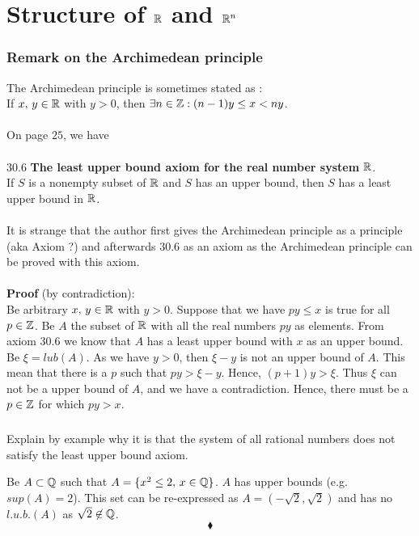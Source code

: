 \chapter{Structure of $\mathbb{R}$ and $\mathbb{R}^{n}$}
\pagebreak[4]

\subsection*{Remark on the Archimedean principle}
The Archimedean principle is sometimes stated as :\\
If $x,\,y\in \mathbb{R}$ with $y>0$, then $\exists n\in \mathbb{Z}: (n-1)y\leq x < ny$.\\\\
On page $25$, we have \\\\
$\mathbf{30.6}$ \textbf{The least upper bound axiom for the real number system} $\mathbf{\mathbb{R}}$.\\
If $S$ is a nonempty subset of $\mathbb{R}$ and $S$ has an upper bound, then $S$ has a least upper bound in $\mathbb{R}$.\\\\
It is strange that  the author first gives the Archimedean principle as a principle (aka Axiom ?) and afterwards $\mathbf{30.6}$ as an axiom as the Archimedean principle can be proved with this axiom. \\\\
\textbf{Proof} (by contradiction):\\
Be arbitrary $x,\, y\in \mathbb{R}$ with $y> 0$. Suppose that we have $py\leq x$ is true for all $p\in \mathbb{Z}$. Be $A$ the subset of $\mathbb{R}$ with all the real numbers $py$ as elements. From axiom $\mathbf{30.6}$ we know that $A$ has a least upper bound with $x$ as an upper bound. Be $\xi= lub(A)$. As we have $y>0$, then $\xi -y$ is not an upper bound of $A$.  This mean that there is a $p$ such that $py>\xi -y$. Hence, $ (p+1)y>\xi$. Thus $\xi$ can not be a upper bound of $A$, and we have a contradiction. Hence, there must be a $p\in \mathbb{Z}$ for which $py>x$.
\newpage
\renewcommand{\thesubsection}{\thesection.\arabic{subsection}}
\setcounter{subsection}{0}
\subsection{}
\begin{tcolorbox}
Explain by example why it is that the system of all rational numbers does not satisfy the least upper bound axiom.
\end{tcolorbox}
Be $A\subset\mathbb{Q}$ such that $A=\{x^2\leq 2,\, x\in \mathbb{Q}\}$. $A$ has upper bounds (e.g.  $sup(A)=2$). This set can be re-expressed as $A= (-\sqrt{2},\sqrt{2})$ and has no $l.u.b.(A)$ as $\sqrt{2}\not \in \mathbb{Q}$.
$$\blacklozenge$$

